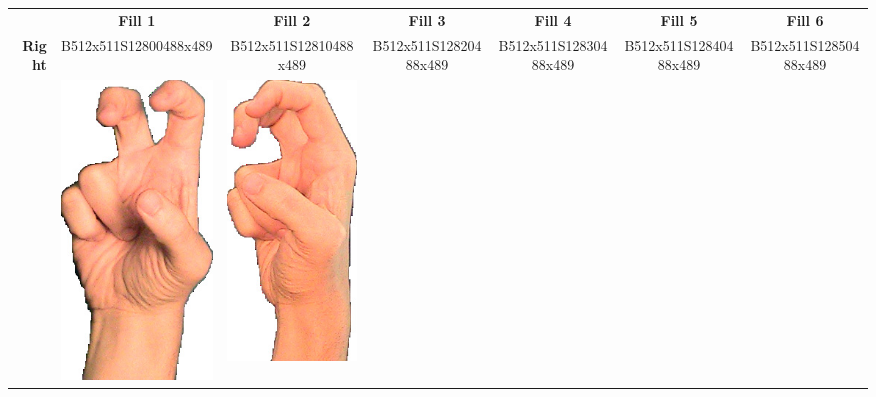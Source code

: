 \documentclass{article}
\begin{document}
\begin{center}
\begin{tabular}{r*{6}{c}}
&\textbf{Fill 1}&\textbf{Fill 2}&\textbf{Fill 3}&\textbf{Fill 4}&\textbf{Fill 5}&\textbf{Fill 6}\\
\multirow{2}{*}{\textbf{Right}}&
B512x511S12800488x489&
B512x511S12810488x489&
B512x511S12820488x489&
B512x511S12830488x489&
B512x511S12840488x489&
B512x511S12850488x489\\
&
\includegraphics[scale=0.1]{images/03-05-1.jpg}&
\includegraphics[scale=0.1]{images/03-05-2.jpg}&

\end{tabular}
\end{center}
\end{document}
